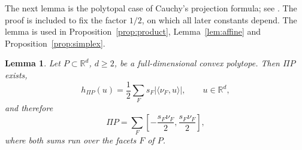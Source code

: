 \documentclass[11pt]{article}
\newtheorem{lemma}[theorem]{Lemma}
\newcommand{\R}{\mathbb R}
\begin{document}
The next lemma is the polytopal case of Cauchy's projection formula; see
\cite[Section~1]{Saroglou}. The proof is included to fix the factor
\(1/2\), on which all later constants depend. The lemma is used in
Proposition~\ref{prop:product}, Lemma~\ref{lem:affine} and
Proposition~\ref{prop:simplex}.

\begin{lemma}\label{lem:facets}
Let \(P\subset\R^d\), \(d\ge2\), be a full-dimensional convex polytope.
Then \(\Pi P\) exists,
\begin{equation}\label{eq:facet}
 h_{\Pi P}(u)=\frac12\sum_Fs_F|\langle\nu_F,u\rangle|,
 \qquad u\in\R^d,
\end{equation}
and therefore
\begin{equation}\label{eq:zonotope}
 \Pi P=\sum_F
 \left[-\frac{s_F\nu_F}{2},\frac{s_F\nu_F}{2}\right],
\end{equation}
where both sums run over the facets \(F\) of \(P\).
\end{lemma}
\end{document}
